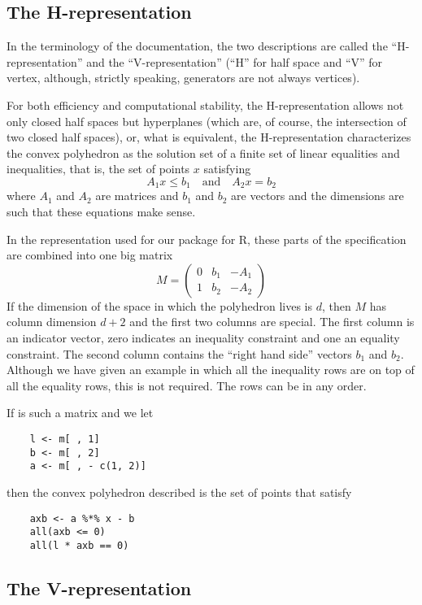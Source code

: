 \documentclass{article}
\begin{document}
\subsection{The H-representation}

In the terminology of the \verb@cddlib@ documentation,
the two descriptions are called
the ``H-representation'' and the ``V-representation''
(``H'' for half space and ``V'' for vertex,
although, strictly speaking, generators are not always vertices).

For both efficiency and computational stability, the H-representation
allows not only closed half spaces but hyperplanes (which are, of course, the
intersection of two closed half spaces), or, what is equivalent,
the H-representation characterizes the convex polyhedron as the solution
set of a finite set of linear equalities and inequalities, that is,
the set of points $x$ satisfying
$$
   A_1 x \le b_1 \quad \text{and} \quad A_2 x = b_2
$$
where $A_1$ and $A_2$ are matrices and $b_1$ and $b_2$ are vectors
and the dimensions are such that these equations make sense.

In the representation used for our \verb@rcdd@ package
for R, these parts of the specification are combined into one big matrix
$$
   M = \begin{pmatrix} 0 & b_1 & - A_1 \\ 1 & b_2 & - A_2 \end{pmatrix}
$$
If the dimension of the space in which the polyhedron lives is $d$,
then $M$ has column dimension $d + 2$ and the first two columns are special.
The first column is an indicator vector, zero indicates an inequality
constraint and one an equality constraint.  The second column contains
the ``right hand side'' vectors $b_1$ and $b_2$.  Although we have given
an example in which all the inequality rows are on top of all the equality
rows, this is not required.  The rows can be in any order.

If \verb@m@ is such a matrix and we let
\begin{verbatim}
    l <- m[ , 1]
    b <- m[ , 2]
    a <- m[ , - c(1, 2)]
\end{verbatim}
then the convex polyhedron described is the set of points \verb@x@ that
satisfy
\begin{verbatim}
    axb <- a %*% x - b
    all(axb <= 0)
    all(l * axb == 0)
\end{verbatim}

\subsection{The V-representation}
\end{document}
